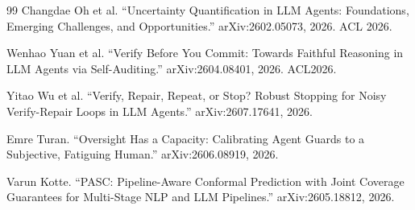\begin{thebibliography}{99}
Changdae Oh et al.
``Uncertainty Quantification in LLM Agents: Foundations, Emerging Challenges, and Opportunities.''
arXiv:2602.05073, 2026. ACL 2026.

Wenhao Yuan et al.
``Verify Before You Commit: Towards Faithful Reasoning in LLM Agents via Self-Auditing.''
arXiv:2604.08401, 2026. ACL2026.

Yitao Wu et al.
``Verify, Repair, Repeat, or Stop? Robust Stopping for Noisy Verify-Repair Loops in LLM Agents.''
arXiv:2607.17641, 2026.

Emre Turan.
``Oversight Has a Capacity: Calibrating Agent Guards to a Subjective, Fatiguing Human.''
arXiv:2606.08919, 2026.

Varun Kotte.
``PASC: Pipeline-Aware Conformal Prediction with Joint Coverage Guarantees for Multi-Stage NLP and LLM Pipelines.''
arXiv:2605.18812, 2026.
\end{thebibliography}

